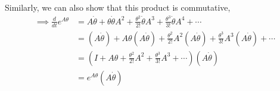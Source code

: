 Similarly, we can also show that this product is commutative,
\begin{align*}
    \implies
    \frac{d}{d t} e^{A \theta}
     & =
    A \dot{\theta}+\theta \dot{\theta} A^2+\frac{\theta^{2}}{2 !} \dot{\theta} A^3+\frac{\theta^{3}}{3 !} \dot{\theta} A^4+\cdots
    \\ & =
    (A \dot{\theta}) + A\theta (A \dot{\theta}) + \frac{\theta^{2}}{2 !} A^{2} (A \dot{\theta}) + \frac{\theta^{3}}{3 !} A^{3} (A \dot{\theta}) + \cdots
    \\ & =
    \left( I+A \theta+\frac{\theta^{2}}{2 !}A^{2}+\frac{\theta^{3}}{3 !}A^{3}+\cdots \right) (A \dot{\theta})
    \\ & =
    e^{A \theta}(A \dot{\theta})
\end{align*}
